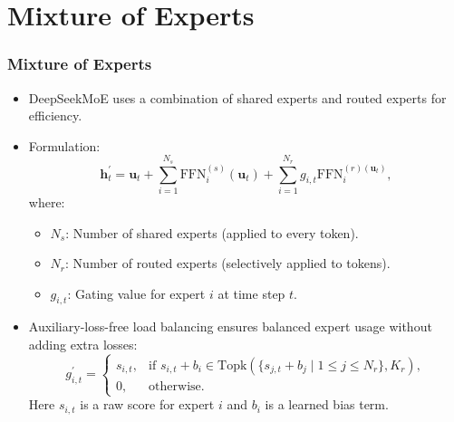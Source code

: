 \documentclass{beamer}
\begin{document}
\section{Mixture of Experts}

\begin{frame}
    \frametitle{Mixture of Experts}
    \begin{itemize}
        \item DeepSeekMoE uses a combination of shared experts and routed experts for efficiency.
        \item Formulation:
              \begin{equation*}
                  \mathbf{h}_t^\prime=\mathbf{u}_t+\sum_{i=1}^{N_s}\text{FFN}_i^{(s)}(\mathbf{u}_t)+\sum_{i=1}^{N_r}g_{i,t}\text{FFN}_i^{(r)(\mathbf{u}_{t})},
              \end{equation*}
              where:
              \begin{itemize}
                  \item $N_s$: Number of shared experts (applied to every token).
                  \item $N_r$: Number of routed experts (selectively applied to tokens).
                  \item $g_{i,t}$: Gating value for expert $i$ at time step $t$.
              \end{itemize}
        \item Auxiliary-loss-free load balancing ensures balanced expert usage without adding extra losses:
              \begin{equation*}
                  g_{i,t}^\prime=
                  \begin{cases}
                      s_{i,t}, & \text{if }s_{i,t}+b_i\in\text{Topk}(\{s_{j,t}+b_j\mid1\leq j\leq N_r\},K_r), \\
                      0,       & \text{otherwise}.
                  \end{cases}
              \end{equation*}
              Here $s_{i,t}$ is a raw score for expert $i$ and $b_i$ is a learned bias term.
    \end{itemize}
\end{frame}
\end{document}
